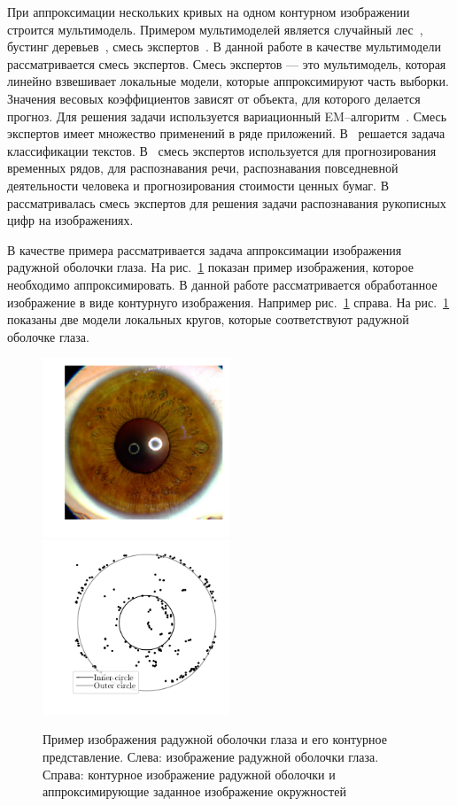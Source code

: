 \documentclass[12pt]{a&t}
\begin{document}
При аппроксимации нескольких кривых на одном контурном изображении строится мультимодель. Примером мультимоделей является случайный лес~\cite{Ishwaran2012}, бустинг деревьев~\cite{Tianqi2016}, смесь экспертов~\cite{Yuksel2012}.
В данной работе в качестве мультимодели рассматривается смесь экспертов.
Смесь экспертов — это мультимодель, которая линейно взвешивает локальные модели, которые аппроксимируют часть выборки.
Значения весовых коэффициентов зависят от объекта, для которого делается прогноз.
Для решения задачи используется вариационный EM--алгоритм~\cite{Dempster1977, Ebrahimpour2009, Peng1996, Grabovoy2021}.
Смесь экспертов имеет множество применений в ряде приложений.
В~\cite{Estabrooks2001} решается задача классификации текстов.
В~\cite{Cheung1995, Weigend2000, Cao2003, Mossavat2010, Sminchisescu2007, Tuerk2001, Yumlu2003} смесь экспертов используется для прогнозирования временных рядов, для распознавания речи, распознавания повседневной деятельности человека и прогнозирования стоимости ценных бумаг.
В~\cite{Ebrahimpour2009} рассматривалась смесь экспертов для решения задачи распознавания рукописных цифр на изображениях.

В качестве примера рассматривается задача аппроксимации изображения радужной оболочки глаза. На рис.~\ref{intro:fig1} показан пример изображения, которое необходимо аппроксимировать.
В данной работе рассматривается обработанное изображение в виде контурнуго изображения. Например рис.~\ref{intro:fig1} справа.
На рис.~\ref{intro:fig1} показаны две модели локальных кругов, которые соответствуют радужной оболочке глаза.

\begin{figure}[h!]
\includegraphics[width=0.5\textwidth]{real_image}
\includegraphics[width=0.5\textwidth]{outline_image}
\caption{Пример изображения радужной оболочки глаза и его контурное представление. Слева: изображение радужной оболочки глаза. Справа: контурное изображение радужной оболочки и аппроксимирующие заданное изображение окружностей}
\label{intro:fig1}
\end{figure}
\end{document}
